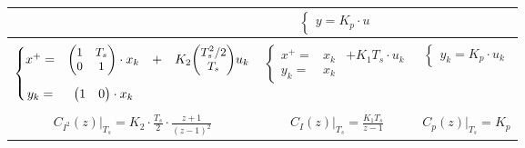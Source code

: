 \begin{table}[H]
{\begin{tabular}[t]{||c||c||c||}
			                                                                          &
			$\left\{\begin{matrix}
					y = K_p \cdot u
				\end{matrix}\right. $                                                                                                   \\[9mm]
			\hline\hline
			                                                                          &                                        &                         \\[-3mm]
			{\normalsize $ \left\{\begin{matrix}
					x^+ = & {\small \begin{pmatrix}
								1 & T_s \\
								0 & 1
							\end{pmatrix}} \cdot x_k & + & K_2 {\small \begin{pmatrix}
						T_s^2/2 \\
						T_s
					\end{pmatrix}} u_k \\
					      &                                                                                                \\[-1mm]
					y_k = & \begin{pmatrix}
						1 & 0
					\end{pmatrix} \cdot x_k
				\end{matrix}\right. $
			}                                                                         & 
		{\normalsize $ \left\{\begin{matrix}
							x^+ = & x_k & + K_1 T_s \cdot u_k \\
							y_k = & x_k
						\end{matrix}\right.$

			}                                                                         &
			$\left\{\begin{matrix}
					y_k        = K_p \cdot u_k
				\end{matrix}\right. $                                                                                                  \\[9mm]
			                                                                          &                                        &                         \\[-3mm]
$ C_{I^2}(z)|_{T_s} = K_2 \cdot \frac{T_s}{2} \cdot \frac{z+1}{(z -1)^2}$ & $ C_I(z)|_{T_s} = \frac{K_1 T_s}{z-1}$ & $ C_p(z)|_{T_s} = K_p $ \\[2mm]

			\hline
		\end{tabular}
	}%
\end{table}\vspace{-3mm}
